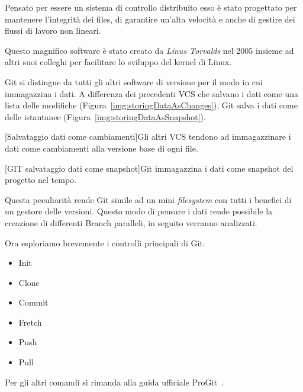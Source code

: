 			Pensato per essere un sistema di controllo distribuito esso è stato progettato per mantenere l'integrità dei files, di garantire un'alta velocità e anche di gestire dei flussi di lavoro non lineari.
			
			Questo magnifico software è stato creato da \textit{Linus Torvalds} nel 2005 insieme ad altri suoi colleghi per facilitare lo sviluppo del kernel di Linux.
			
			Git si distingue da tutti gli altri software di versione per il modo in cui immagazzina i dati. A differenza dei precedenti VCS che salvano i dati come una lista delle modifiche (Figura~\ref{img:storingDataAsChanges}), Git salva i dati come delle istantanee (Figura~\ref{img:storingDataAsSnapshot}). 
			
			\begin{center}
				[Salvataggio dati come cambiamenti]{Gli altri VCS tendono ad immagazzinare i dati come cambiamenti alla versione base di ogni file.}
				\label{img:storingDataAsChanges}
			\end{center}
		
			\begin{center}
				[GIT salvataggio dati come snapshot]{Git immagazzina i dati come snapshot del progetto nel tempo.}\label{img:storingDataAsSnapshot}
			\end{center}
			
			Questa peculiarità rende Git simile ad un mini \textit{filesystem} con tutti i benefici di un gestore delle versioni.
			Questo modo di pensare i dati rende possibile la creazione di differenti Branch paralleli, in seguito verranno analizzati.
			
			Ora esploriamo brevemente i controlli principali di Git:
			
			\begin{itemize}
				\item Init
				\item Clone
				\item Commit
				\item Fretch
				\item Push
				\item Pull
			\end{itemize}
			Per gli altri comandi si rimanda alla guida ufficiale ProGit~\citep{ProGit2018}.
			
